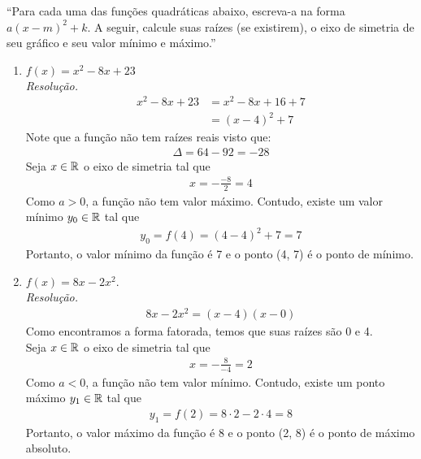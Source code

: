 \enquote{Para cada uma das funções quadráticas abaixo, escreva-a na forma $a(x - m)^2 + k$. A seguir, calcule suas raízes (se existirem), o eixo de simetria de seu gráfico e seu valor mínimo e máximo.}
\begin{enumerate}
    \item $f(x) = x^2 - 8x + 23$ \\
    \emph{Resolução.}
    \begin{align*}
        x^2 - 8x + 23 & = x^2 - 8x + 16 + 7 \\ & =
        (x - 4)^2 + 7
    \end{align*}
    Note que a função não tem raízes reais visto que:
    \begin{align*}
        \Delta = 64 - 92 = -28
    \end{align*}
    Seja $x \in \mathbb R$ o eixo de simetria tal que
    \begin{align*}
        x = -\frac{-8}{2} = 4
    \end{align*}
    Como $a > 0$, a função não tem valor máximo. Contudo, existe um valor mínimo $y_0 \in \mathbb R$ tal que
    \begin{align*}
        y_0 = f(4) = (4 - 4)^2 + 7 = 7
    \end{align*}
    Portanto, o valor mínimo da função é 7 e o ponto (4, 7) é o ponto de mínimo.
    
    \item $f(x) = 8x - 2x^2$. \\
    \emph{Resolução.}
    \begin{align*}
        8x -2x^2 = (x - 4)(x - 0)
    \end{align*}
    Como encontramos a forma fatorada, temos que suas raízes são 0 e 4. \\
    Seja $x \in \mathbb R$ o eixo de simetria tal que
    \begin{align*}
        x = -\frac{8}{-4} = 2
    \end{align*}
    Como $a < 0$, a função não tem valor mínimo. Contudo, existe um ponto máximo $y_1 \in \mathbb R$ tal que
    \begin{align*}
        y_1 = f(2) = 8 \cdot 2 - 2 \cdot 4 = 8
    \end{align*}
    Portanto, o valor máximo da função é 8 e o ponto (2, 8) é o ponto de máximo absoluto.


\end{enumerate}
